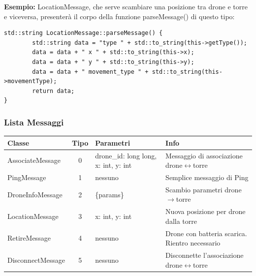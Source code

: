 \documentclass[a4paper, 11pt]{article}
\begin{document}
\textbf{Esempio:} LocationMessage, che serve scambiare una posizione tra drone e torre e viceversa, presenterà il corpo della funzione parseMessage() di questo tipo:
\begin{lstlisting}[style=customcpp]
    std::string LocationMessage::parseMessage() {
        std::string data = "type " + std::to_string(this->getType());
        data = data + " x " + std::to_string(this->x);
        data = data + " y " + std::to_string(this->y);
        data = data + " movement_type " + std::to_string(this->movementType);
        return data;
}
\end{lstlisting}
\subsubsection{Lista Messaggi}


\small

\begin{adjustbox}{max width=\textwidth}
    \begin{tabularx}{\textwidth}{|L|c|L|L|}
    \hline
    \rule{0pt}{3ex} %
    \textbf{Classe} & \textbf{Tipo} & \textbf{Parametri} & \textbf{Info} \\
    \hline
    \rule{0pt}{3ex} %
    AssociateMessage & 0 & drone\_id: long long, x: int, y: int & Messaggio di associazione drone$\leftrightarrow$torre \\
    \hline
    \rule{0pt}{3ex} %
    PingMessage & 1 & nessuno & Semplice messaggio di Ping \\
    \hline
    \rule{0pt}{3ex} %
    DroneInfoMessage & 2 & \{params\} & Scambio parametri drone$\rightarrow$torre \\
    \hline
    \rule{0pt}{3ex} %
    LocationMessage & 3 & x: int, y: int & Nuova posizione per drone dalla torre \\
    \hline
    \rule{0pt}{3ex} %
    RetireMessage & 4 & nessuno & Drone con batteria scarica. Rientro necessario \\
    \hline
    \rule{0pt}{3ex} %
    DisconnectMessage & 5 & nessuno & Disconnette l'associazione drone$\leftrightarrow$torre \\
    \hline
    \end{tabularx}
\end{adjustbox}\vspace{5 mm}
\end{document}
